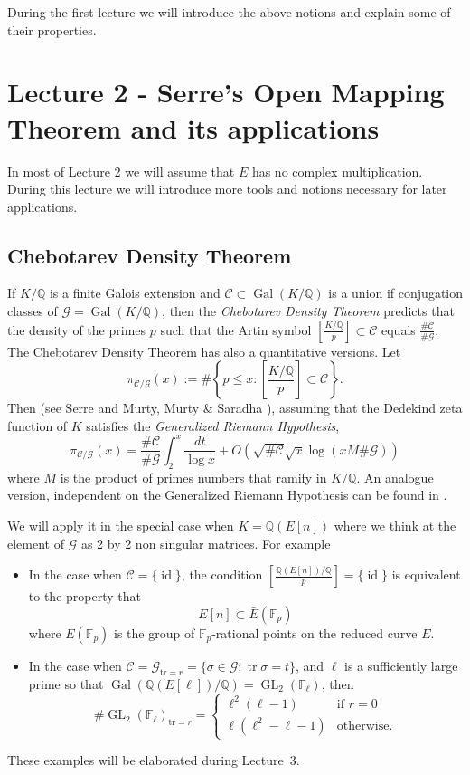 \documentclass[a4paper,10pt]{article}
\newcommand{\F}{\mathbb{F}}
\newcommand{\Q}{\mathbb{Q}}
\begin{document}
During the first lecture we will introduce the above notions and explain some of their properties.

\section{Lecture 2 - Serre's Open Mapping Theorem and its applications}

In most of Lecture 2 we will assume that $E$ has no complex multiplication. During this lecture we will introduce more tools and notions necessary
for later applications.

\subsection{Chebotarev Density Theorem}

If $K/\Q$ is a finite Galois extension and $\mathcal C\subset\operatorname{Gal}(K/\Q)$ is a union if conjugation classes of 
$\mathcal G=\operatorname{Gal}(K/\Q)$, then the \emph{Chebotarev Density Theorem} predicts that 
the density of the primes $p$ such that the Artin symbol
$\left[\frac{K/\Q}p\right]\subset \mathcal C$ equals $\frac{\#\mathcal C}{\#\mathcal G}.$
The Chebotarev Density Theorem has also a quantitative versions. Let
$$\pi_{\mathcal C/\mathcal G}(x):=\#\left\{p\le x: \left[\frac{K/\Q}p\right]\subset \mathcal C\right\}.$$
Then (see Serre \cite{S3} and Murty, Murty \& Saradha \cite{MMS}), assuming that the Dedekind zeta function of $K$ satisfies the \emph{Generalized Riemann Hypothesis}, 
$$\pi_{\mathcal C/\mathcal G}(x)=
\frac{\#\mathcal C}{\#\mathcal G}\int_2^x\frac{dt}{\log x}+O\left(\sqrt{\#\mathcal C}\sqrt{x}\log(xM\#\mathcal G)\right)$$
where $M$ is the product of primes numbers that ramify in $K/\Q$. An analogue version, independent on the Generalized Riemann Hypothesis can be
found in \cite{S3}.

We will apply it in the special case when $K=\Q(E[n])$ where we think at the element of $\mathcal G$ as 2 by 2 non singular matrices. For example
\begin{itemize}
 \item In the case when $\mathcal C=\{\operatorname{id}\}$, the condition $\left[\frac{\Q(E[n])/\Q}p\right]=\{\operatorname{id}\}$ is equivalent
to the property that 
$$E[n]\subset \bar{E}(\F_p)$$
where $\overline E(\F_p)$ is the group of $\F_p$-rational points on the reduced curve $\overline E$.
\item In the case when $\mathcal C=\mathcal G_{\text{tr}=r}=\{\sigma\in\mathcal G:\operatorname{tr}\sigma=t\}$, and $\ell$ is a sufficiently large prime so that $\operatorname{Gal}(\Q(E[\ell])/\Q)=
\operatorname{GL}_2(\F_\ell)$, then
$$\#\operatorname{GL}_2(\F_\ell)_{\text{tr}=r}=\begin{cases}
                   \ell^2(\ell-1) & \text{if } r=0\\
                   \ell(\ell^2-\ell-1) & \text{otherwise.}
                  \end{cases}
$$
\end{itemize}
These examples will be elaborated during Lecture~3.
\end{document}

